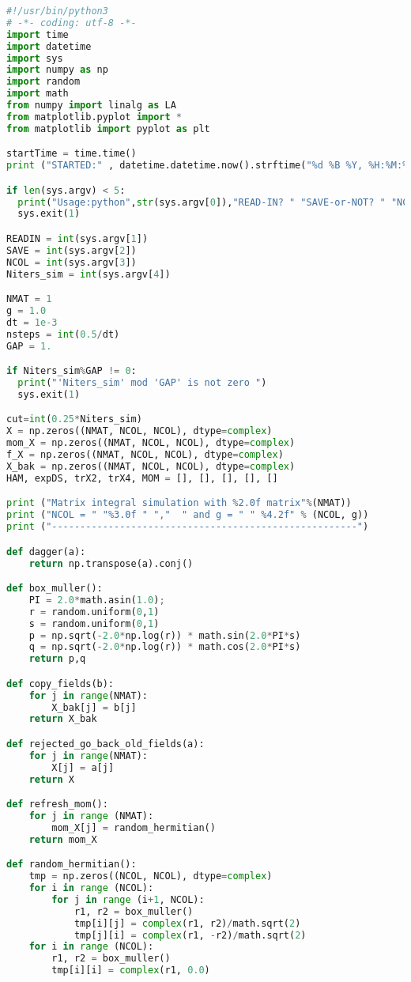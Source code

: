 \begin{footnotesize} 
\begin{lstlisting}[language=Python]
#!/usr/bin/python3
# -*- coding: utf-8 -*-
import time 
import datetime 
import sys
import numpy as np
import random
import math
from numpy import linalg as LA
from matplotlib.pyplot import *
from matplotlib import pyplot as plt

startTime = time.time()
print ("STARTED:" , datetime.datetime.now().strftime("%d %B %Y, %H:%M:%S"))

if len(sys.argv) < 5:
  print("Usage:python",str(sys.argv[0]),"READ-IN? " "SAVE-or-NOT? " "NCOL " "NITERS")
  sys.exit(1)

READIN = int(sys.argv[1])
SAVE = int(sys.argv[2])
NCOL = int(sys.argv[3]) 
Niters_sim = int(sys.argv[4])

NMAT = 1
g = 1.0
dt = 1e-3
nsteps = int(0.5/dt) 
GAP = 1.

if Niters_sim%GAP != 0:
  print("'Niters_sim' mod 'GAP' is not zero ")
  sys.exit(1) 

cut=int(0.25*Niters_sim) 
X = np.zeros((NMAT, NCOL, NCOL), dtype=complex)
mom_X = np.zeros((NMAT, NCOL, NCOL), dtype=complex)
f_X = np.zeros((NMAT, NCOL, NCOL), dtype=complex)
X_bak = np.zeros((NMAT, NCOL, NCOL), dtype=complex)
HAM, expDS, trX2, trX4, MOM = [], [], [], [], []

print ("Matrix integral simulation with %2.0f matrix"%(NMAT)) 
print ("NCOL = " "%3.0f " ","  " and g = " " %4.2f" % (NCOL, g)) 
print ("------------------------------------------------------")

def dagger(a):
    return np.transpose(a).conj()

def box_muller():  
    PI = 2.0*math.asin(1.0);    
    r = random.uniform(0,1)
    s = random.uniform(0,1)
    p = np.sqrt(-2.0*np.log(r)) * math.sin(2.0*PI*s)
    q = np.sqrt(-2.0*np.log(r)) * math.cos(2.0*PI*s)
    return p,q

def copy_fields(b):
    for j in range(NMAT):
        X_bak[j] = b[j]
    return X_bak

def rejected_go_back_old_fields(a):
    for j in range(NMAT):
        X[j] = a[j]
    return X

def refresh_mom():
    for j in range (NMAT):
        mom_X[j] = random_hermitian()
    return mom_X

def random_hermitian():
    tmp = np.zeros((NCOL, NCOL), dtype=complex)
    for i in range (NCOL):
        for j in range (i+1, NCOL):
            r1, r2 = box_muller()
            tmp[i][j] = complex(r1, r2)/math.sqrt(2)
            tmp[j][i] = complex(r1, -r2)/math.sqrt(2)
    for i in range (NCOL):
        r1, r2 = box_muller()
        tmp[i][i] = complex(r1, 0.0) 


\end{lstlisting}
\end{footnotesize}
